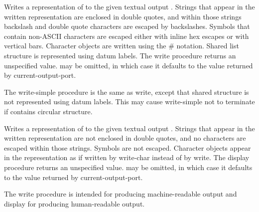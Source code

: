 \begin{entry}{%
}

Writes a representation of  to the given textual output
.  Strings
that appear in the written representation are enclosed in double quotes, and
within those strings backslash and double quote characters are
escaped by backslashes.  Symbols that contain non-ASCII characters
are escaped either with inline hex escapes or with vertical bars.
Character objects are written using the {\cf \#\backwhack} notation.
Shared list structure is represented using datum labels.
The {\cf write} procedure returns an unspecified value.
 may be omitted, in which case it defaults to the value
returned by {\cf current-output-port}.

\end{entry}

\begin{entry}{%
}

The {\cf write-simple} procedure is the same as {\cf write}, except that shared structure is
not represented using datum labels.  This may cause {\cf write-simple} not to
terminate if  contains circular structure.

\end{entry}


\begin{entry}{%
}

Writes a representation of  to the given textual output .
Strings that appear in the written representation are not enclosed in
double quotes, and no characters are escaped within those strings.  
Symbols are not escaped.  Character
objects appear in the representation as if written by {\cf write-char}
instead of by {\cf write}.  The {\cf display} procedure returns an unspecified value.
 may be omitted, in which case it defaults to the
value returned by {\cf current-output-port}.

\begin{rationale}
The {\cf write} procedure is intended
for producing mach\-ine-readable output and {\cf display} for producing
human-readable output.  
\end{rationale}
\end{entry}


